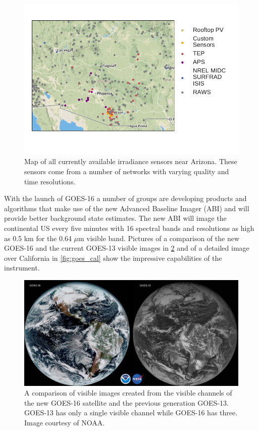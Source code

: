 \begin{figure}[h]
\centering
\includegraphics[width=\textwidth]{figs/azmap.pdf}
\vspace{-3em}
\caption[Map of all available irradiance sensors]{Map of all currently
available irradiance sensors near Arizona. These sensors come from a
number of networks with varying quality and time resolutions.}
\label{fig:allsensors}
\end{figure}

With the launch of GOES-16 a number of groups are developing products
and algorithms that make use of the new Advanced Baseline Imager
(ABI) and will provide better background state estimates.
The new ABI will image the continental US every five minutes with 16
spectral bands and resolutions as high as 0.5 km for the 0.64 $\mu$m
visible band.
Pictures of a comparison of the new GOES-16 and the current GOES-13
visible images in \cref{fig:goes_comp} and of a detailed image over
California in \cref{fig:goes_cal} show the impressive capabilities of
the instrument.

\begin{figure}[t]
\centering
\includegraphics[width=\textwidth]{figs/goes_comp.jpg}
\caption[Comparison of visible images from the current and future
GOES]{A comparison of visible images created from the visible channels
of the new GOES-16 satellite and the previous generation
GOES-13. GOES-13 has only a single visible channel while GOES-16 has
three. Image courtesy of NOAA.}
\label{fig:goes_comp}
\end{figure}

